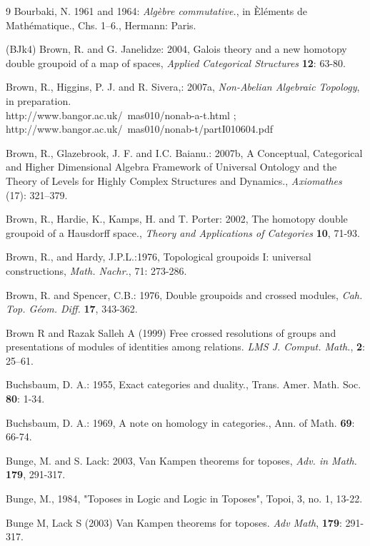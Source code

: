 \documentclass[12pt]{article}
\theoremstyle{plain}
\theoremstyle{definition}
\numberwithin{equation}{section}
\newcommand{\<}{{\langle}}
\begin{document}
\begin{thebibliography} {9}
Bourbaki, N. 1961 and 1964: \emph{Alg\`{e}bre commutative.},
in \`{E}l\'{e}ments de Math\'{e}matique., Chs. 1--6., Hermann: Paris.

\bibitem (BJk4)
Brown, R. and G. Janelidze: 2004, Galois theory and a new homotopy
double groupoid of a map of spaces, \emph{Applied Categorical
Structures} \textbf{12}: 63-80.

Brown, R., Higgins, P. J. and R. Sivera,: 2007a, \emph{Non-Abelian
Algebraic Topology}, in preparation.\\
http://www.bangor.ac.uk/~mas010/nonab-a-t.html ; \\
http://www.bangor.ac.uk/~mas010/nonab-t/partI010604.pdf

Brown, R., Glazebrook, J. F. and I.C. Baianu.: 2007b, A Conceptual, Categorical and Higher Dimensional Algebra Framework of Universal Ontology and the Theory of Levels for Highly Complex Structures and Dynamics., \emph{Axiomathes} (17): 321--379.

Brown, R., Hardie, K., Kamps, H. and T. Porter: 2002, The homotopy double groupoid of a Hausdorff space., \emph{Theory and Applications of Categories} \textbf{10}, 71-93.

Brown, R., and Hardy, J.P.L.:1976, Topological groupoids I: universal constructions, \emph{Math. Nachr.}, 71: 273-286.

Brown, R. and Spencer, C.B.: 1976, Double groupoids and crossed modules, \emph{Cah.  Top. G\'{e}om. Diff.} \textbf{17}, 343-362.

Brown R and Razak Salleh A (1999) Free crossed resolutions of groups and presentations of modules of
identities among relations. {\em LMS J. Comput. Math.}, \textbf{2}: 25--61.

Buchsbaum, D. A.: 1955, Exact categories and duality., Trans. Amer. Math. Soc. \textbf{80}: 1-34.

Buchsbaum, D. A.: 1969, A note on homology in categories., Ann. of Math. \textbf{69}: 66-74.

Bunge, M. and S. Lack: 2003, Van Kampen theorems for toposes, \emph{Adv. in Math.} \textbf{179}, 291-317.

Bunge, M., 1984, "Toposes in Logic and Logic in Toposes", Topoi, 3, no. 1, 13-22. 

Bunge M, Lack S (2003) Van Kampen theorems for toposes. {\em Adv Math}, \textbf {179}: 291-317.


\end{thebibliography}
\end{document}
